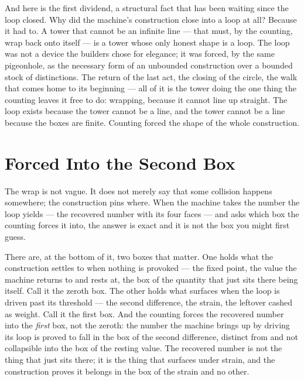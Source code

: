 And here is the first dividend, a structural fact that has been waiting since the loop closed. Why
did the machine's construction close into a loop at all? Because it had to. A tower that cannot be an infinite
line --- that must, by the counting, wrap back onto itself --- is a tower whose only honest shape is a loop. The
loop was not a device the builders chose for elegance; it was forced, by the same pigeonhole, as the necessary
form of an unbounded construction over a bounded stock of distinctions. The return of the last act, the closing
of the circle, the walk that comes home to its beginning --- all of it is the tower doing the one thing the
counting leaves it free to do: wrapping, because it cannot line up straight. The loop exists because the tower
cannot be a line, and the tower cannot be a line because the boxes are finite. Counting forced the shape of the
whole construction.

\section{Forced Into the Second Box}

The wrap is not vague. It does not merely say that some collision happens somewhere; the construction pins where.
When the machine takes the number the loop yields --- the recovered number with its four
faces --- and asks which box the counting forces it into, the answer is exact and it is not the box you might
first guess.

There are, at the bottom of it, two boxes that matter. One holds what the construction settles to when nothing is
provoked --- the fixed point, the value the machine returns to and rests at, the box of the quantity that just
sits there being itself. Call it the zeroth box. The other holds what surfaces when the loop is driven past its
threshold --- the second difference, the strain, the leftover cashed as weight. Call it the
first box. And the counting forces the recovered number into the \emph{first} box, not the zeroth: the number the
machine brings up by driving its loop is proved to fall in the box of the second difference, distinct from and not
collapsible into the box of the resting value. The recovered number is not the thing that just sits there; it is
the thing that surfaces under strain, and the construction proves it belongs in the box of the strain and no
other.


